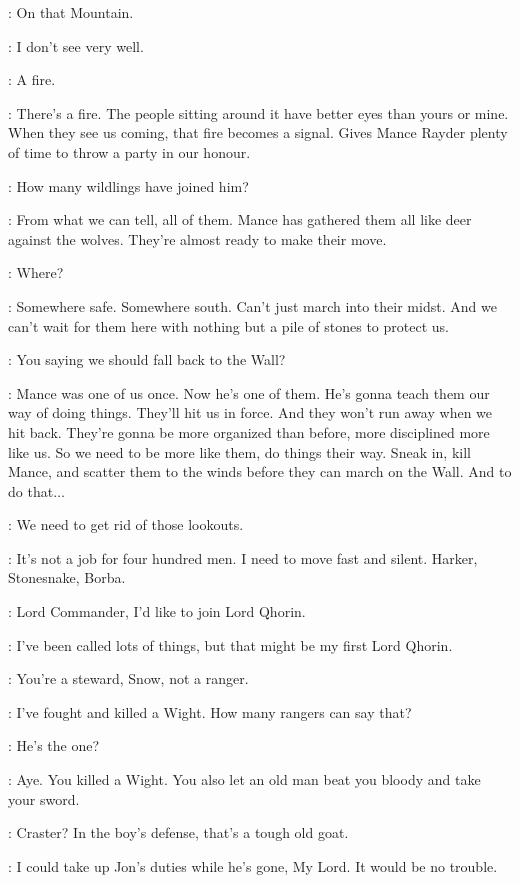 \HALFHAND: On that Mountain. 

\SAM: I don't see very well. 

\JON: A fire. 

\HALFHAND: There's a fire. The people sitting around it have better eyes than yours or mine. When they see us coming, that fire becomes a signal. Gives Mance Rayder plenty of time to throw a party in our honour. 

\JEOR: How many wildlings have joined him? 

\HALFHAND: From what we can tell, all of them. Mance has gathered them all like deer against the wolves. They're almost ready to make their move. 

\JON: Where? 

\HALFHAND: Somewhere safe. Somewhere south. Can't just march into their midst. And we can't wait for them here with nothing but a pile of stones to protect us. 

\JEOR: You saying we should fall back to the Wall? 

\HALFHAND: Mance was one of us once. Now he's one of them. He's gonna teach them our way of doing things. They'll hit us in force. And they won't run away when we hit back. They're gonna be more organized than before, more disciplined more like us. So we need to be more like them, do things their way. Sneak in, kill Mance, and scatter them to the winds before they can march on the Wall. And to do that$\ldots$ 

\JEOR: We need to get rid of those lookouts. 

\HALFHAND: It's not a job for four hundred men. I need to move fast and silent. Harker, Stonesnake, Borba. 

\JON: Lord Commander, I'd like to join Lord Qhorin. 

\HALFHAND: I've been called lots of things, but that might be my first Lord Qhorin. 

\JEOR: You're a steward, Snow, not a ranger. 

\JON: I've fought and killed a Wight. How many rangers can say that? 

\HALFHAND: He's the one? 

\JEOR: Aye. You killed a Wight. You also let an old man beat you bloody and take your sword. 


\HALFHAND: Craster? In the boy's defense, that's a tough old goat. 

\SAM: I could take up Jon's duties while he's gone, My Lord. It would be no trouble. 

